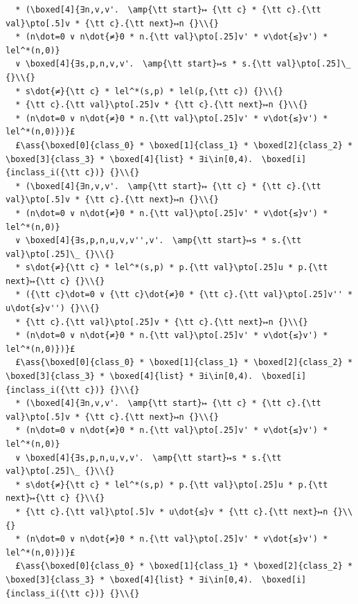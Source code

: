 \documentclass[12pt,a4paper]{article}
\makeatletter
\newcommand{\ml}[2][t]{\mbox{\mdseries\begin{tabular}[#1]{@{}L@{}}#2\end{tabular}}}
\newcommand{\ass}[1]{\ensuremath{{\color{blue}\left\{\ml[c]{#1}\right\}}}}
\makeatother
\begin{document}
\begin{lstlisting}
  * (\boxed[4]{∃n,v,v'． \amp{\tt start}↦ {\tt c} * {\tt c}.{\tt val}\pto[.5]v * {\tt c}.{\tt next}↦n {}\\{}
  * (n\dot=0 ∨ n\dot{≠}0 * n.{\tt val}\pto[.25]v' * v\dot{≤}v') * lel^*(n,0)}
  ∨ \boxed[4]{∃s,p,n,v,v'． \amp{\tt start}↦s * s.{\tt val}\pto[.25]\_ {}\\{}
  * s\dot{≠}{\tt c} * lel^*(s,p) * lel(p,{\tt c}) {}\\{}
  * {\tt c}.{\tt val}\pto[.25]v * {\tt c}.{\tt next}↦n {}\\{}
  * (n\dot=0 ∨ n\dot{≠}0 * n.{\tt val}\pto[.25]v' * v\dot{≤}v') * lel^*(n,0)})}£
  £\ass{\boxed[0]{class_0} * \boxed[1]{class_1} * \boxed[2]{class_2} * \boxed[3]{class_3} * \boxed[4]{list} * ∃i\in[0,4)． \boxed[i]{inclass_i({\tt c})} {}\\{}
  * (\boxed[4]{∃n,v,v'． \amp{\tt start}↦ {\tt c} * {\tt c}.{\tt val}\pto[.5]v * {\tt c}.{\tt next}↦n {}\\{}
  * (n\dot=0 ∨ n\dot{≠}0 * n.{\tt val}\pto[.25]v' * v\dot{≤}v') * lel^*(n,0)}
  ∨ \boxed[4]{∃s,p,n,u,v,v'',v'． \amp{\tt start}↦s * s.{\tt val}\pto[.25]\_ {}\\{}
  * s\dot{≠}{\tt c} * lel^*(s,p) * p.{\tt val}\pto[.25]u * p.{\tt next}↦{\tt c} {}\\{}
  * ({\tt c}\dot=0 ∨ {\tt c}\dot{≠}0 * {\tt c}.{\tt val}\pto[.25]v'' * u\dot{≤}v'') {}\\{}
  * {\tt c}.{\tt val}\pto[.25]v * {\tt c}.{\tt next}↦n {}\\{}
  * (n\dot=0 ∨ n\dot{≠}0 * n.{\tt val}\pto[.25]v' * v\dot{≤}v') * lel^*(n,0)})}£
  £\ass{\boxed[0]{class_0} * \boxed[1]{class_1} * \boxed[2]{class_2} * \boxed[3]{class_3} * \boxed[4]{list} * ∃i\in[0,4)． \boxed[i]{inclass_i({\tt c})} {}\\{}
  * (\boxed[4]{∃n,v,v'． \amp{\tt start}↦ {\tt c} * {\tt c}.{\tt val}\pto[.5]v * {\tt c}.{\tt next}↦n {}\\{}
  * (n\dot=0 ∨ n\dot{≠}0 * n.{\tt val}\pto[.25]v' * v\dot{≤}v') * lel^*(n,0)}
  ∨ \boxed[4]{∃s,p,n,u,v,v'． \amp{\tt start}↦s * s.{\tt val}\pto[.25]\_ {}\\{}
  * s\dot{≠}{\tt c} * lel^*(s,p) * p.{\tt val}\pto[.25]u * p.{\tt next}↦{\tt c} {}\\{}
  * {\tt c}.{\tt val}\pto[.5]v * u\dot{≤}v * {\tt c}.{\tt next}↦n {}\\{}
  * (n\dot=0 ∨ n\dot{≠}0 * n.{\tt val}\pto[.25]v' * v\dot{≤}v') * lel^*(n,0)})}£
  £\ass{\boxed[0]{class_0} * \boxed[1]{class_1} * \boxed[2]{class_2} * \boxed[3]{class_3} * \boxed[4]{list} * ∃i\in[0,4)． \boxed[i]{inclass_i({\tt c})} {}\\{}

\end{lstlisting}
\end{document}
